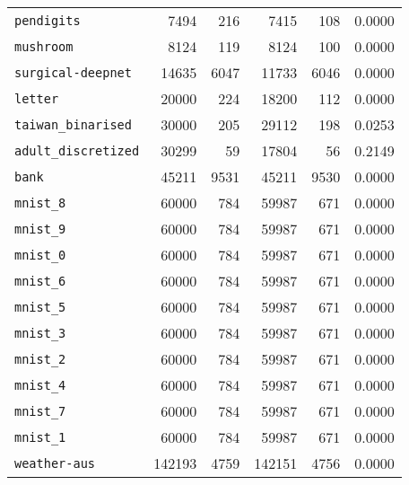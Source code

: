 \begin{tabular}{lrrrrr}
\texttt{pendigits}& 7494& 216& 7415& 108& 0.0000\\
\texttt{mushroom}& 8124& 119& 8124& 100& 0.0000\\
\texttt{surgical-deepnet}& 14635& 6047& 11733& 6046& 0.0000\\
\texttt{letter}& 20000& 224& 18200& 112& 0.0000\\
\texttt{taiwan\_binarised}& 30000& 205& 29112& 198& 0.0253\\
\texttt{adult\_discretized}& 30299& 59& 17804& 56& 0.2149\\
\texttt{bank}& 45211& 9531& 45211& 9530& 0.0000\\
\texttt{mnist\_8}& 60000& 784& 59987& 671& 0.0000\\
\texttt{mnist\_9}& 60000& 784& 59987& 671& 0.0000\\
\texttt{mnist\_0}& 60000& 784& 59987& 671& 0.0000\\
\texttt{mnist\_6}& 60000& 784& 59987& 671& 0.0000\\
\texttt{mnist\_5}& 60000& 784& 59987& 671& 0.0000\\
\texttt{mnist\_3}& 60000& 784& 59987& 671& 0.0000\\
\texttt{mnist\_2}& 60000& 784& 59987& 671& 0.0000\\
\texttt{mnist\_4}& 60000& 784& 59987& 671& 0.0000\\
\texttt{mnist\_7}& 60000& 784& 59987& 671& 0.0000\\
\texttt{mnist\_1}& 60000& 784& 59987& 671& 0.0000\\
\texttt{weather-aus}& 142193& 4759& 142151& 4756& 0.0000\\
\bottomrule
\end{tabular}
